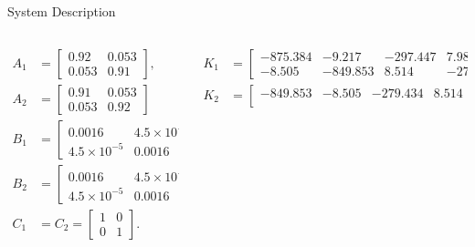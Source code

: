 \begin{slide}{System Description}
  \begin{columns}[c]
    \begin{column}{0.38\textwidth}
      \begin{equation}
        \begin{aligned}
          A_1 & =
          \begin{bmatrix}
            0.92  & 0.053 \\
            0.053 & 0.91
          \end{bmatrix},          \\
          A_2 & = \begin{bmatrix}
            0.91  & 0.053 \\
            0.053 & 0.92
          \end{bmatrix}   \\
          B_1 & =
          \begin{bmatrix}
            0.0016           & 4.5\times10^{-5} \\
            4.5\times10^{-5} & 0.0016
          \end{bmatrix},          \\
          B_2 & = \begin{bmatrix}
            0.0016           & 4.5\times10^{-5} \\
            4.5\times10^{-5} & 0.0016
          \end{bmatrix}, \\
          C_1 & = C_2 =
          \begin{bmatrix}
            1 & 0 \\
            0 & 1
          \end{bmatrix}.
        \end{aligned}
      \end{equation}
    \end{column}
    \hfill%
    \begin{column}{0.58\textwidth}
      \begin{equation}
        \begin{aligned}
          K_1 & = \begin{bmatrix}
            -875.384 & -9.217   & -297.447 & 7.982    \\
            -8.505   & -849.853 & 8.514    & -279.434
          \end{bmatrix}, \\
          K_2 & = \begin{bmatrix}
            -849.853 & -8.505   & -279.434 & 8.514    \\

\end{bmatrix}
\end{aligned}
\end{equation}
\end{column}
\end{columns}
\end{slide}

